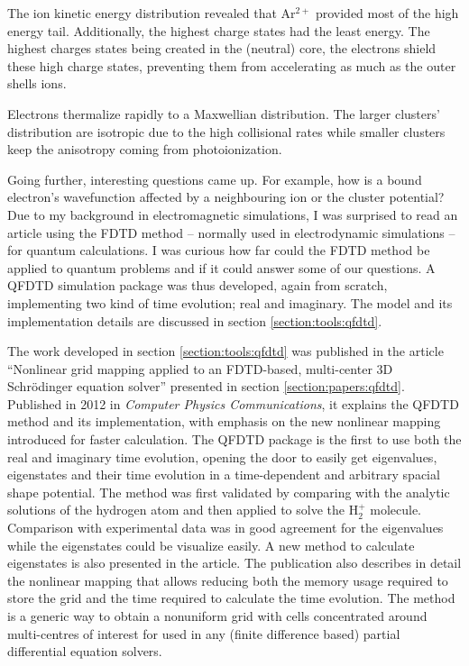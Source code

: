 The ion kinetic energy distribution revealed that Ar$^{2+}$  provided most of
the high energy tail. Additionally, the highest charge states had the least
energy. The highest charges states being created in the (neutral) core, the
electrons shield these high charge states, preventing them from accelerating
as much as the outer shells ions.

Electrons thermalize rapidly to a Maxwellian distribution. The larger clusters'
distribution are isotropic due to the high collisional rates while smaller
clusters keep the anisotropy coming from photoionization.







Going further, interesting questions came up. For example, how is a bound
electron's wavefunction affected by a neighbouring ion or the cluster potential?
Due to my background in electromagnetic simulations, I was surprised to read
an article using the FDTD method -- normally used in electrodynamic simulations --
for quantum calculations. I was curious how far could the FDTD method be
applied to quantum problems and if it could answer some of our questions.
A QFDTD simulation package was thus developed, again from scratch,  implementing
two kind of time evolution; real and imaginary. The model and its implementation details
are discussed in section \ref{section:tools:qfdtd}.

The work developed in section \ref{section:tools:qfdtd} was published in the article
``Nonlinear grid mapping applied to an FDTD-based, multi-center 3D
Schr\"odinger equation solver'' presented in section \ref{section:papers:qfdtd}.
Published in 2012 in \textit{Computer Physics Communications}\cite{Bigaouette2011}, it
explains the QFDTD method and its implementation, with emphasis on the new
nonlinear mapping introduced for faster calculation. The QFDTD package is the
first to use both the real and imaginary time evolution, opening the door to
easily get eigenvalues, eigenstates and their time evolution in a time-dependent
and arbitrary spacial shape potential.
The method was first validated by comparing with the analytic solutions of
the hydrogen atom and then applied to solve the H$_{2}^{+}$ molecule.
Comparison with experimental data was in good agreement for the eigenvalues
while the eigenstates could be visualize easily. A new method to calculate
eigenstates is also presented in the article. The publication also
describes in detail the nonlinear mapping that allows reducing both the memory
usage required to store the grid and the time required to calculate the time
evolution. The method is a generic way to obtain a nonuniform grid with cells
concentrated around multi-centres of interest for used in any (finite difference
based) partial differential equation solvers.

